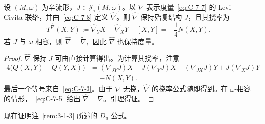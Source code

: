 \begin{lemma}\label{lem:C-7-2}
设 $(M,\omega)$ 为辛流形，$J\in\mathcal J_\tau(M,\omega)$。以 $\nabla$ 表示度量~\eqref{eq:C-7-7} 的 Levi--Civita 联络，并由~\eqref{eq:C-7-8} 定义 $\widehat\nabla$。则 $\widehat\nabla$ 保持殆复结构 $J$，且其挠率为
\[
  T^{\widehat\nabla}(X,Y)
  :=\widehat\nabla_YX-\widehat\nabla_XY-[X,Y]
  =-\frac14N(X,Y).
\]
若 $J$ 与 $\omega$ 相容，则 $\widehat\nabla=\widetilde\nabla$，因此 $\widehat\nabla$ 也保持度量。
\end{lemma}
\begin{proof}
$\widehat\nabla$ 保持 $J$ 可由直接计算得出。为计算其挠率，注意
\begin{align*}
  4\bigl(Q(X,Y)-Q(Y,X)\bigr)
  &=(\nabla_{JY}J)X-J(\nabla_YJ)X
    -(\nabla_{JX}J)Y+J(\nabla_XJ)Y\\
  &=-N(X,Y).
\end{align*}
最后一个等号来自~\eqref{eq:C-7-3}。由于 $\nabla$ 无挠，$\widehat\nabla$ 的挠率公式随即得到。在 $\omega$-相容的情形，~\eqref{eq:C-7-5} 给出 $\widehat\nabla=\widetilde\nabla$。引理得证。
\end{proof}

现在证明注~\ref{rem:3-1-3} 所述的 $D_u$ 公式。


